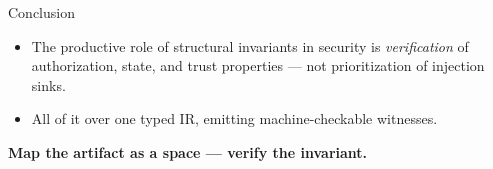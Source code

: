 \documentclass[aspectratio=169,11pt]{beamer}
\begin{document}
\begin{frame}{Conclusion}
  \begin{itemize}
    \item The productive role of structural invariants in security is
          \emph{verification} of authorization, state, and trust properties ---
          not prioritization of injection sinks.
    \item All of it over one typed IR, emitting machine-checkable witnesses.
  \end{itemize}
  \vspace{2mm}
  \centering
  \Large\color{valen}\textbf{Map the artifact as a space --- verify the invariant.}
\end{frame}
\end{document}
